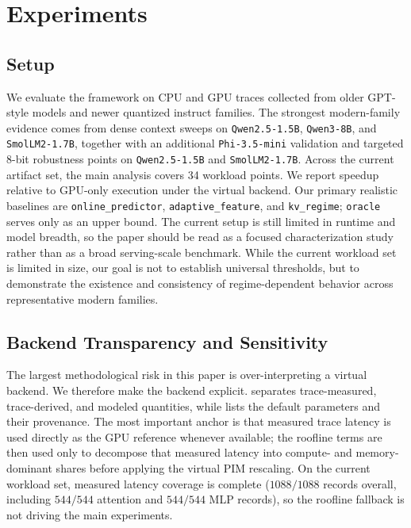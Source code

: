 \section{Experiments}
\label{sec:experiments}

\subsection{Setup}

We evaluate the framework on CPU and GPU traces collected from older GPT-style models and newer quantized instruct families. The strongest modern-family evidence comes from dense context sweeps on \texttt{Qwen2.5-1.5B}, \texttt{Qwen3-8B}, and \texttt{SmolLM2-1.7B}, together with an additional \texttt{Phi-3.5-mini} validation and targeted 8-bit robustness points on \texttt{Qwen2.5-1.5B} and \texttt{SmolLM2-1.7B}. Across the current artifact set, the main analysis covers 34 workload points. We report speedup relative to GPU-only execution under the virtual backend. Our primary realistic baselines are \texttt{online\_predictor}, \texttt{adaptive\_feature}, and \texttt{kv\_regime}; \texttt{oracle} serves only as an upper bound. The current setup is still limited in runtime and model breadth, so the paper should be read as a focused characterization study rather than as a broad serving-scale benchmark. While the current workload set is limited in size, our goal is not to establish universal thresholds, but to demonstrate the existence and consistency of regime-dependent behavior across representative modern families.

\subsection{Backend Transparency and Sensitivity}

The largest methodological risk in this paper is over-interpreting a virtual backend. We therefore make the backend explicit.  separates trace-measured, trace-derived, and modeled quantities, while  lists the default parameters and their provenance. The most important anchor is that measured trace latency is used directly as the GPU reference whenever available; the roofline terms are then used only to decompose that measured latency into compute- and memory-dominant shares before applying the virtual PIM rescaling. On the current workload set, measured latency coverage is complete ($1088/1088$ records overall, including $544/544$ attention and $544/544$ MLP records), so the roofline fallback is not driving the main experiments.

